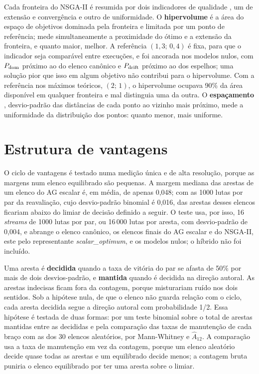 Cada fronteira do NSGA-II é resumida por dois indicadores de qualidade \cite{deb2001multiobjective}, um de extensão e convergência e outro de uniformidade. O \textbf{hipervolume} \cite{zitzler1999multiobjective} é a área do espaço de objetivos dominada pela fronteira e limitada por um ponto de referência; mede simultaneamente a proximidade do ótimo e a extensão da fronteira, e quanto maior, melhor. A referência $(1{,}3;\, 0{,}4)$ é fixa, para que o indicador seja comparável entre execuções, e foi ancorada nos modelos nulos, com $P_{\mathrm{dom}}$ próximo ao do elenco canônico e $P_{\mathrm{drift}}$ próximo ao dos espelhos; uma solução pior que isso em algum objetivo não contribui para o hipervolume. Com a referência nos máximos teóricos, $(2;\, 1)$, o hipervolume ocupava 90\% da área disponível em qualquer fronteira e mal distinguia uma da outra. O \textbf{espaçamento} \cite{schott1995fault}, desvio-padrão das distâncias de cada ponto ao vizinho mais próximo, mede a uniformidade da distribuição dos pontos: quanto menor, mais uniforme.

\section{Estrutura de vantagens}
\label{sec: protocolo_ciclo}

O ciclo de vantagens é testado numa medição única e de alta resolução, porque as margens num elenco equilibrado são pequenas. A margem mediana das arestas de um elenco do AG escalar é, em média, de apenas 0,048; com as 1000 lutas por par da reavaliação, cujo desvio-padrão binomial é 0,016, \cicloIndecisasMil{} das arestas desses elencos ficariam abaixo do limiar de decisão definido a seguir. O teste usa, por isso, 16 \textit{streams} de 1000 lutas por par, ou 16\,000 lutas por aresta, com desvio-padrão de 0,004, e abrange o elenco canônico, os elencos finais do AG escalar e do NSGA-II, este pelo representante \textit{scalar\_optimum}, e os modelos nulos; o híbrido não foi incluído.

Uma aresta é \textbf{decidida} quando a taxa de vitória do par se afasta de 50\% por mais de dois desvios-padrão, e \textbf{mantida} quando é decidida na direção autoral. As arestas indecisas ficam fora da contagem, porque misturariam ruído nos dois sentidos. Sob a hipótese nula, de que o elenco não guarda relação com o ciclo, cada aresta decidida segue a direção autoral com probabilidade 1/2. Essa hipótese é testada de duas formas: por um teste binomial sobre o total de arestas mantidas entre as decididas e pela comparação das taxas de manutenção de cada braço com as dos 30 elencos aleatórios, por Mann-Whitney e $\hat{A}_{12}$. A comparação usa a taxa de manutenção em vez da contagem, porque um elenco aleatório decide quase todas as arestas e um equilibrado decide menos; a contagem bruta puniria o elenco equilibrado por ter uma aresta sobre o limiar.

